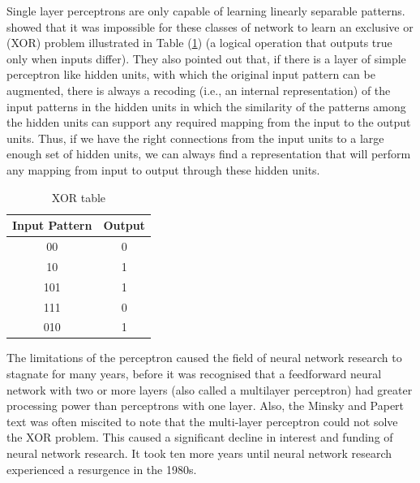 \documentclass[12pt]{report}
\numberwithin{equation}{section}
\begin{document}
Single layer perceptrons are only capable of learning linearly separable patterns. {\cite{MinskyPapert:69}} showed that it was impossible for these classes of network to learn an exclusive or (XOR) problem illustrated in Table (\ref{tab:xor}) (a logical operation that outputs true only when inputs differ). They also pointed out that, if there is a layer of simple perceptron like hidden units, with which the original input pattern can be augmented, there is always a recoding (i.e., an internal representation) of the input patterns in the hidden units in which the similarity of the patterns among the hidden units can support any required mapping from the input to the output units. Thus, if we have the right connections
from the input units to a large enough set of hidden units, we can always find a representation that will perform any mapping from input to output through these hidden units.
\begin{table}
\centering
\begin{tabular}{cc}
\hline
Input Pattern & Output \\
\hline
00 & 0 \\
10 & 1 \\
101& 1 \\
111 & 0 \\
010 & 1 \\
\hline
\end{tabular}
\caption{XOR table}
\label{tab:xor}
\end{table}

The limitations of the perceptron caused the field of neural network research to stagnate for many years, before it was recognised that a feedforward neural network with two or more layers (also called a multilayer perceptron) had greater processing power than perceptrons with one layer. Also, the Minsky and Papert text was often miscited to note that the multi-layer perceptron could not solve the XOR problem. This caused a significant decline in interest and funding of neural network research. It took ten more years until neural network research experienced a resurgence in the 1980s. 
\end{document}
